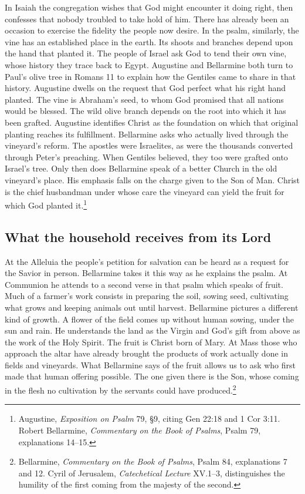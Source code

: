 In Isaiah the congregation wishes that God might encounter it doing right, then confesses that nobody troubled to take hold of him. There has already been an occasion to exercise the fidelity the people now desire. In the psalm, similarly, the vine has an established place in the earth. Its shoots and branches depend upon the hand that planted it. The people of Israel ask God to tend their own vine, whose history they trace back to Egypt. Augustine and Bellarmine both turn to Paul's olive tree in Romans 11 to explain how the Gentiles came to share in that history. Augustine dwells on the request that God perfect what his right hand planted. The vine is Abraham's seed, to whom God promised that all nations would be blessed. The wild olive branch depends on the root into which it has been grafted. Augustine identifies Christ as the foundation on which that original planting reaches its fulfillment. Bellarmine asks who actually lived through the vineyard's reform. The apostles were Israelites, as were the thousands converted through Peter's preaching. When Gentiles believed, they too were grafted onto Israel's tree. Only then does Bellarmine speak of a better Church in the old vineyard's place. His emphasis falls on the charge given to the Son of Man. Christ is the chief husbandman under whose care the vineyard can yield the fruit for which God planted it.\footnote{Augustine, \textit{Exposition on Psalm} 79, §9, citing Gen 22:18 and 1 Cor 3:11. Robert Bellarmine, \textit{Commentary on the Book of Psalms}, Psalm 79, explanations 14--15.}

\subsection{What the household receives from its Lord}

At the Alleluia the people's petition for salvation can be heard as a request for the Savior in person. Bellarmine takes it this way as he explains the psalm. At Communion he attends to a second verse in that psalm which speaks of fruit. Much of a farmer's work consists in preparing the soil, sowing seed, cultivating what grows and keeping animals out until harvest. Bellarmine pictures a different kind of growth. A flower of the field comes up without human sowing, under the sun and rain. He understands the land as the Virgin and God's gift from above as the work of the Holy Spirit. The fruit is Christ born of Mary. At Mass those who approach the altar have already brought the products of work actually done in fields and vineyards. What Bellarmine says of the fruit allows us to ask who first made that human offering possible. The one given there is the Son, whose coming in the flesh no cultivation by the servants could have produced.\footnote{Bellarmine, \textit{Commentary on the Book of Psalms}, Psalm 84, explanations 7 and 12. Cyril of Jerusalem, \textit{Catechetical Lecture} XV.1--3, distinguishes the humility of the first coming from the majesty of the second.}


